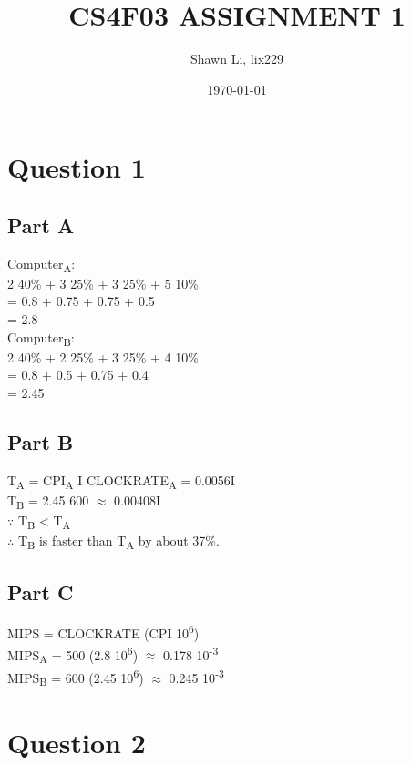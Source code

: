 \documentclass[11pt]{article}
\author{Shawn Li, lix229}
\date{\today}
\title{CS4F03 ASSIGNMENT 1}
\begin{document}
\maketitle
\tableofcontents

\newpage
\section{Question 1}
\label{sec:org87f0e4b}
\subsection{Part A}
\label{sec:orgc9da988}
Computer\textsubscript{A}: \\
2 \texttimes{} 40\% + 3 \texttimes{} 25\% + 3 \texttimes{} 25\% + 5 \texttimes{} 10\% \\
= 0.8 + 0.75 + 0.75 + 0.5 \\
= 2.8 \\
Computer\textsubscript{B}: \\
2 \texttimes{} 40\% + 2 \texttimes{} 25\% + 3 \texttimes{} 25\% + 4 \texttimes{} 10\% \\
= 0.8 + 0.5 + 0.75 + 0.4 \\
= 2.45
\subsection{Part B}
\label{sec:orgaca6a4a}
T\textsubscript{A} = CPI\textsubscript{A} \texttimes{} I \textdiv{} CLOCKRATE\textsubscript{A} = 0.0056I \\
T\textsubscript{B} = 2.45 \textdiv{} 600 \(\approx\) 0.00408I \\
\(\because\) T\textsubscript{B} < T\textsubscript{A} \\
\(\therefore\) T\textsubscript{B} is faster than T\textsubscript{A} by about 37\%.
\subsection{Part C}
\label{sec:org0a1bd2b}
MIPS = CLOCKRATE \textdiv{} (CPI \texttimes{} 10\textsuperscript{6}) \\
MIPS\textsubscript{A} = 500 \textdiv{} (2.8 \texttimes{} 10\textsuperscript{6}) \(\approx\) 0.178 \texttimes{} 10\textsuperscript{-3}\\
MIPS\textsubscript{B} = 600 \textdiv{} (2.45 \texttimes{} 10\textsuperscript{6}) \(\approx\) 0.245 \texttimes{} 10\textsuperscript{-3}
\section{Question 2}
\label{sec:orgd6c2e43}
\end{document}
